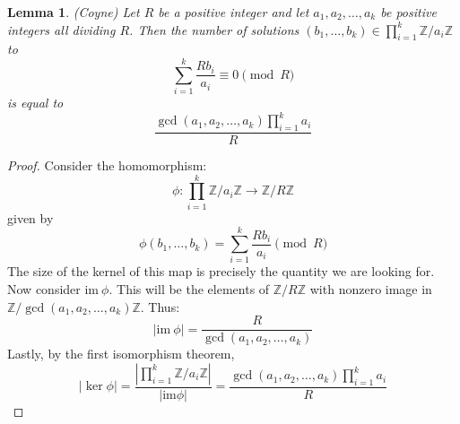 \documentclass{article}
\newcommand{\Z}{\mathbb{Z}}
\newcommand{\im}[0]{\mathrm{im}}
\newtheorem{lemma}[theorem]{Lemma}
\theoremstyle{definition}
\theoremstyle{definition}
\theoremstyle{remark}
\begin{document}
\begin{lemma} (Coyne) \label{lem:bless_the_coyne} Let $R$ be a positive integer and let $a_1, a_2, \ldots, a_k$ be positive integers all dividing $R$. Then the number of solutions $(b_1, \ldots, b_k) \in \prod_{i=1}^k \Z/a_i\Z$ to
\[\sum_{i = 1}^k \frac{Rb_i}{a_i} \equiv 0 \pmod{R}\]
is equal to 
\[\displaystyle\frac{\gcd(a_1, a_2, \ldots, a_k)\prod_{i=1}^k a_i}{R}\]
\end{lemma}
\begin{proof} 
Consider the homomorphism:
\[\phi : \prod_{i=1}^k \Z/a_i\Z \to \Z/R\Z \]
given by 
\[\phi(b_1, \ldots, b_k) = \sum_{i = 1}^k \frac{Rb_i}{a_i} \pmod{R}\]
The size of the kernel of this map is precisely the quantity we are looking for. Now consider $\im \ \phi$. This will be the elements of $\Z/R\Z$ with nonzero image in $\Z/\gcd(a_1, a_2, \ldots, a_k)\Z$. Thus:
\[|\im \ \phi| = \frac{R}{\gcd(a_1, a_2, \ldots, a_k)}\]
Lastly, by the first isomorphism theorem,
\[|\ker\phi| = \frac{|\prod_{i=1}^k \Z/a_i\Z|}{|\im \phi|} = \frac{\gcd(a_1, a_2, \ldots, a_k)\prod_{i=1}^k a_i}{R}\]
\end{proof}
\end{document}
